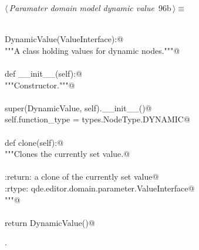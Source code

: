 \documentclass[
    a4paper,      %
    10pt,         %
    openright,    %
    notitlepage,  %
    parskip=half, %
]{scrreprt}       %
\theoremstyle{definition}                    %
\begin{document}
\begin{flushleft} \small
\begin{minipage}{\linewidth}\label{scrap154}\raggedright\small
{} $\langle\,${\itshape Paramater domain model dynamic value}\nobreak\ {\footnotesize {96b}}$\,\rangle\equiv$
\vspace{-1exm}
\begin{list}{}{} \item
\mbox{}\lstinline@@\\
\mbox{}\lstinline@class DynamicValue(ValueInterface):@\\
\mbox{}\lstinline@    """A class holding values for dynamic nodes."""@\\
\mbox{}\lstinline@@\\
\mbox{}\lstinline@    def __init__(self):@\\
\mbox{}\lstinline@        """Constructor."""@\\
\mbox{}\lstinline@@\\
\mbox{}\lstinline@        super(DynamicValue, self).__init__()@\\
\mbox{}\lstinline@        self.function_type = types.NodeType.DYNAMIC@\\
\mbox{}\lstinline@@\\
\mbox{}\lstinline@    def clone(self):@\\
\mbox{}\lstinline@        """Clones the currently set value.@\\
\mbox{}\lstinline@@\\
\mbox{}\lstinline@        :return: a clone of the currently set value@\\
\mbox{}\lstinline@        :rtype:  qde.editor.domain.parameter.ValueInterface@\\
\mbox{}\lstinline@        """@\\
\mbox{}\lstinline@@\\
\mbox{}\lstinline@        return DynamicValue()@{\NWsep}
\end{list}
\vspace{-1.5ex}
\footnotesize
\begin{list}{}{\setlength{\itemsep}{-\parsep}\setlength{\itemindent}{-\leftmargin}}
\item {\NWtxtMacroNoRef}.

\item{}
\end{list}
\end{minipage}\vspace{4ex}
\end{flushleft}
\end{document}
